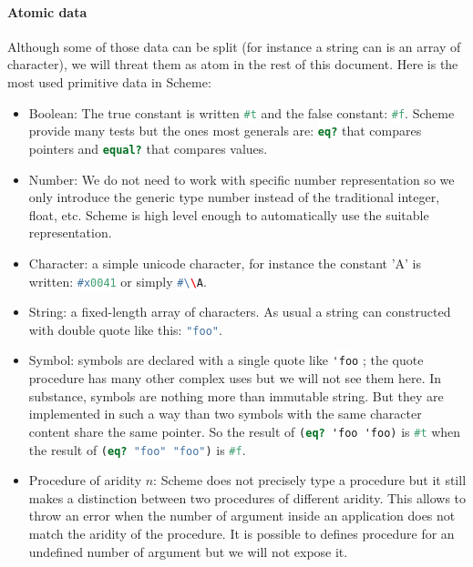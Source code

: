 \documentclass[a4paper]{report}
\newcommand{\ischeme}[1]{\colorbox{white}{\lstinline[language=scheme]&#1&}} %
\begin{document}
\begin{appendices}
\paragraph{Atomic data} Although some of those data can be split (for instance a string can is an array of character), we will threat them as atom in the rest of this document. Here is the most used primitive data in Scheme:
\begin{itemize}
\item Boolean: The true constant is written \ischeme{#t} and the false constant: \ischeme{#f}. Scheme provide many tests but the ones most generals are: \ischeme{eq?} that compares pointers and \ischeme{equal?} that compares values.
\item Number: We do not need to work with specific number representation so we only introduce the generic type number instead of the traditional integer, float, etc. Scheme is high level enough to automatically use the suitable representation.
\item Character: a simple unicode character, for instance the constant 'A' is written: \ischeme{#x0041} or simply \ischeme{#\\A}.
\item String: a fixed-length array of characters. As usual a string can constructed with double quote like this: \ischeme{"foo"}.
\item Symbol: symbols are declared with a single quote like \ischeme{'foo} ; the quote procedure has many other complex uses but we will not see them here. In substance, symbols are nothing more than immutable string. But they are implemented in such a way than two symbols with the same character content share the same pointer. So the result of \ischeme{(eq? 'foo 'foo)} is \ischeme{#t} when the result of \ischeme{(eq? "foo" "foo")} is \ischeme{#f}.
\item Procedure of aridity $n$: Scheme does not precisely type a procedure but it still makes a distinction between two procedures of different aridity. This allows to throw an error when the number of argument inside an application does not match the aridity of the procedure. It is possible to defines procedure for an undefined number of argument but we will not expose it.
\end{itemize}


\end{appendices}
\end{document}
